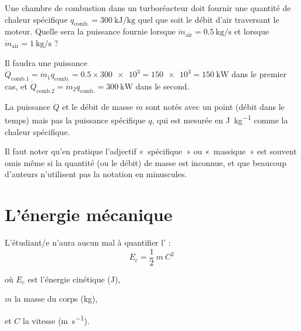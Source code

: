 \begin{description}
			\begin{anexample}
				Une chambre de combustion dans un turboréacteur doit fournir une quantité de chaleur spécifique $q_{\text{comb.}} = \SI{300}{\kilo\joule\per\kilogram}$ quel que soit le débit d’air traversant le moteur. Quelle sera la puissance fournie lorsque $\dot{m}_\text{air} = \SI{0,5}{\kilogram\per\second}$ et lorsque $\dot{m}_\text{air} = \SI{1}{\kilogram\per\second}$ ?
		
				\begin{answer}Il faudra une puissance $\dot{Q}_{\text{comb.}1} = \dot{m}_1 q_{\text{comb.}} = \num{0,5} \times \num{300e3} = \num{150e3} = \SI{150}{\kilo\watt}$ dans le premier cas, et $\dot{Q}_{\text{comb.}2} = \dot{m}_2 q_{\text{comb.}} = \SI{300}{\kilo\watt}$ dans le second.
					\begin{remark}La puissance $\dot{Q}$ et le débit de masse $\dot{m}$ sont notés avec un point (débit dans le temps) mais pas la puissance spécifique $q$, qui est mesurée en \si{\joule\per\kilogram} comme la chaleur spécifique.\end{remark}\end{answer}
			\end{anexample}
		
		\end{description}

		Il faut noter qu’en pratique l’adjectif «~spécifique~» ou «~massique~» est souvent omis même si la quantité (ou le débit) de masse est inconnue, et que beaucoup d’auteurs n’utilisent pas la notation en minuscules.
		
\section{L’énergie mécanique}
\label{ch_energie_mecanique}

	L’étudiant/e n’aura aucun mal à quantifier l’ :
	\begin{equation}
	E_{c} = \frac{1}{2} \ m \ C^2
	\label{eq_énergie_cinétique}
	\end{equation}

	\begin{equationterms}
		\item où \tab $E_{c}$ 	\tab est l’énergie cinétique (\si{\joule}),
		\item 	\tab $m$ 		\tab la masse du corps (\si{\kilogram}),
		\item et	\tab $C$			\tab la vitesse (\si{\metre\per\second}).
	\end{equationterms}

